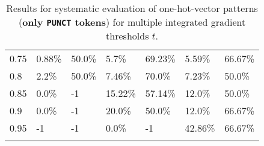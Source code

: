 \begin{table}[t]
\begin{tabular}{lllllll}
\multicolumn{1}{l|}{0.75}&  0.88\% & \multicolumn{1}{l|}{50.0\%}& 5.7\% & \multicolumn{1}{l|}{69.23\%}& 5.59\% & 66.67\%\\ 
\multicolumn{1}{l|}{0.8}&  2.2\% & \multicolumn{1}{l|}{50.0\%}& 7.46\% & \multicolumn{1}{l|}{70.0\%}& 7.23\% & 50.0\%\\ 
\multicolumn{1}{l|}{0.85}&  0.0\% & \multicolumn{1}{l|}{-1}& 15.22\% & \multicolumn{1}{l|}{57.14\%}& 12.0\% & 50.0\%\\ 
\multicolumn{1}{l|}{0.9}&  0.0\% & \multicolumn{1}{l|}{-1}& 20.0\% & \multicolumn{1}{l|}{50.0\%}& 12.0\% & 66.67\%\\ 
\multicolumn{1}{l|}{0.95}&  -1 & \multicolumn{1}{l|}{-1}& 0.0\% & \multicolumn{1}{l|}{-1}& 42.86\% & 66.67\%\\ 


\\ \hline
\end{tabular}
\caption[Model Evaluation for only \texttt{PUNCT} tokens]{Results for systematic evaluation of one-hot-vector patterns (\textbf{only \texttt{PUNCT} tokens}) for multiple integrated gradient thresholds $t$.}
\label{tab:evalResultsPUNCT}
\end{table}
	